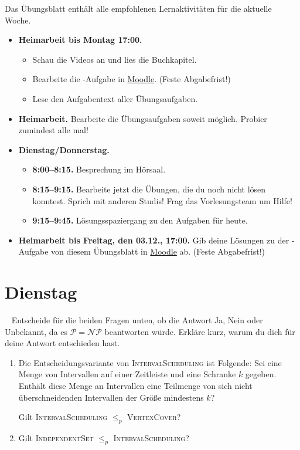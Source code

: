 \documentclass{uebung_cs}
\begin{document}
Das Übungsblatt enthält alle empfohlenen Lernaktivitäten für die aktuelle Woche.

\begin{itemize}
\item \textbf{Heimarbeit bis Montag 17:00.}
    \begin{itemize}
    \item 
    Schau die Videos an und lies die Buchkapitel.
    \item Bearbeite die -Aufgabe in \href{https://moodle.studiumdigitale.uni-frankfurt.de/moodle/course/view.php?id=2241}{Moodle}. (Feste Abgabefrist!)
    \item Lese den Aufgabentext aller Übungsaufgaben.
    \end{itemize}
\item \textbf{Heimarbeit.} Bearbeite die Übungsaufgaben soweit möglich. Probier zumindest alle mal!
\item \textbf{Dienstag/Donnerstag.}
\begin{itemize}
    \item \textbf{8:00--8:15.} Besprechung im Hörsaal.
    \item \textbf{8:15--9:15.} Bearbeite jetzt die Übungen, die du noch nicht lösen konntest. Sprich mit anderen Studis! Frag das Vorlesungsteam um Hilfe!
    \item \textbf{9:15--9:45.} Lösungsspaziergang zu den Aufgaben für heute.
\end{itemize}

\item \textbf{Heimarbeit bis Freitag, den 03.12., 17:00.} Gib deine Lösungen zu der -Aufgabe von diesem Übungsblatt in \href{https://moodle.studiumdigitale.uni-frankfurt.de/moodle/course/view.php?id=2241}{Moodle} ab. (Feste Abgabefrist!)
\end{itemize}

\section*{Dienstag}

\begin{aufgabe}[NP]\
	Entscheide für die beiden Fragen unten, ob die Antwort \glqq Ja\grqq{}, \glqq Nein\grqq{} oder \glqq Unbekannt, da es $\mathcal{P} = \mathcal{NP}$ beantworten würde\grqq{}. Erkläre kurz, warum du dich für deine Antwort entschieden hast.
	\begin{enumerate}
		\item Die Entscheidungsvariante von \textsc{IntervalScheduling} ist Folgende: Sei eine Menge von Intervallen auf einer Zeitleiste und eine Schranke $k$ gegeben. Enthält diese Menge an Intervallen eine Teilmenge von sich nicht überschneidenden Intervallen der Größe mindestens $k$?
		
		Gilt \textsc{IntervalScheduling} $\leq_p$ \textsc{VertexCover}?
		\item Gilt \textsc{IndependentSet} $\leq_p$ \textsc{IntervalScheduling}?
	\end{enumerate}
\end{aufgabe}
\end{document}
